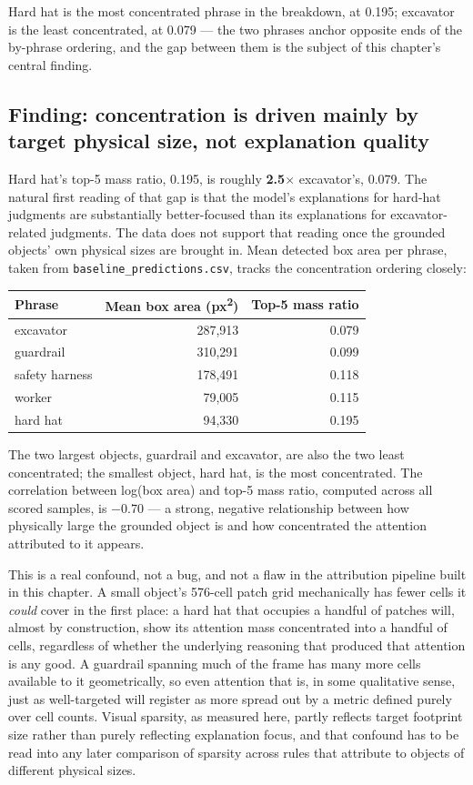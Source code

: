 Hard hat is the most concentrated phrase in the breakdown, at 0.195; excavator is the least
concentrated, at 0.079 --- the two phrases anchor opposite ends of the by-phrase ordering, and the
gap between them is the subject of this chapter's central finding.

\subsection{Finding: concentration is driven mainly by target physical size, not explanation quality}

Hard hat's top-5 mass ratio, 0.195, is roughly \textbf{2.5$\times$} excavator's, 0.079. The
natural first reading of that gap is that the model's explanations for hard-hat judgments are
substantially better-focused than its explanations for excavator-related judgments. The data does
not support that reading once the grounded objects' own physical sizes are brought in. Mean
detected box area per phrase, taken from \texttt{baseline\_predictions.csv}, tracks the
concentration ordering closely:

\begin{center}
\begin{tabular}{lrr}
\toprule
\textbf{Phrase} & \textbf{Mean box area (px\textsuperscript{2})} & \textbf{Top-5 mass ratio} \\
\midrule
excavator & 287{,}913 & 0.079 \\
guardrail & 310{,}291 & 0.099 \\
safety harness & 178{,}491 & 0.118 \\
worker & 79{,}005 & 0.115 \\
hard hat & 94{,}330 & 0.195 \\
\bottomrule
\end{tabular}
\end{center}

The two largest objects, guardrail and excavator, are also the two least concentrated; the
smallest object, hard hat, is the most concentrated. The correlation between log(box area) and
top-5 mass ratio, computed across all scored samples, is \textbf{$-0.70$} --- a strong,
negative relationship between how physically large the grounded object is and how concentrated
the attention attributed to it appears.

This is a real confound, not a bug, and not a flaw in the attribution pipeline built in this
chapter. A small object's 576-cell patch grid mechanically has fewer cells it \emph{could} cover
in the first place: a hard hat that occupies a handful of patches will, almost by construction,
show its attention mass concentrated into a handful of cells, regardless of whether the
underlying reasoning that produced that attention is any good. A guardrail spanning much of the
frame has many more cells available to it geometrically, so even attention that is, in some
qualitative sense, just as well-targeted will register as more spread out by a metric defined
purely over cell counts. Visual sparsity, as measured here, partly reflects target footprint size
rather than purely reflecting explanation focus, and that confound has to be read into any later
comparison of sparsity across rules that attribute to objects of different physical sizes.

